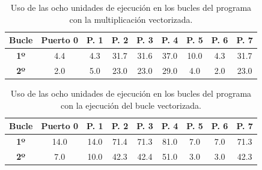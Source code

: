 \documentclass[conference]{IEEEtran}
\begin{document}
\begin{table}[htbp]
\caption{Uso de las ocho unidades de ejecución en los bucles del programa con la multiplicación vectorizada.}
    \begin{center}
    \resizebox{0.48\textwidth}{!} {
    \begin{tabular}{|c|c|c|c|c|c|c|c|c|}
    \hline
    \rowcolor[HTML]{EFEFEF} 
    \textbf{Bucle}                      & \textbf{Puerto 0} & \textbf{P. 1} & \textbf{P. 2} & \textbf{P. 3} & \textbf{P. 4} & \textbf{P. 5} & \textbf{P. 6} & \textbf{P. 7} \\ \hline
    \cellcolor[HTML]{EFEFEF}\textbf{1º} & 4.4               & 4.3               & 31.7              & 31.6              & 37.0              & 10.0              & 4.3               & 31.7              \\ \hline
    \cellcolor[HTML]{EFEFEF}\textbf{2º} & 2.0               & 5.0               & 23.0              & 23.0              & 29.0              & 4.0               & 2.0               & 23.0              \\ \hline
    \end{tabular}
    \label{usoPuertosMultiplicacion}
    }
    \end{center}
\end{table}

\begin{table}[htbp]
\caption{Uso de las ocho unidades de ejecución en los bucles del programa con la ejecución del bucle vectorizada.}
    \begin{center}
    \resizebox{0.48\textwidth}{!} {
    \begin{tabular}{|c|c|c|c|c|c|c|c|c|}
    \hline
    \rowcolor[HTML]{EFEFEF} 
    \textbf{Bucle}                      & \textbf{Puerto 0} & \textbf{P. 1} & \textbf{P. 2} & \textbf{P. 3} & \textbf{P. 4} & \textbf{P. 5} & \textbf{P. 6} & \textbf{P. 7} \\ \hline
    \cellcolor[HTML]{EFEFEF}\textbf{1º} & 14.0              & 14.0              & 71.4              & 71.3              & 81.0              & 7.0               & 7.0               & 71.3              \\ \hline
    \cellcolor[HTML]{EFEFEF}\textbf{2º} & 7.0               & 10.0              & 42.3              & 42.4              & 51.0              & 3.0               & 3.0               & 42.3              \\ \hline
    \end{tabular}
    \label{usoPuertosBucle}
    }
    \end{center}
\end{table}
\end{document}
